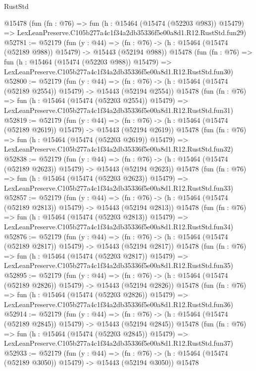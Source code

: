 \begin{lexlean}{RustStd}
\begin{coremodule}
    @15478
    (fun (fn : @76) =>
    fun (h : @15464 (@15474 (@52203 @983)) @15479) =>
    LexLeanPreserve.C105b277a4c1f34a2db35336f5e00a8d1.R12.RustStd.fun29)
@52781 := @52179
    (fun (y : @44) =>
    (fn : @76) -> (h : @15464 (@15474 (@52189 @988)) @15479) -> @15443 (@52194 @988))
    @15478
    (fun (fn : @76) =>
    fun (h : @15464 (@15474 (@52203 @988)) @15479) =>
    LexLeanPreserve.C105b277a4c1f34a2db35336f5e00a8d1.R12.RustStd.fun30)
@52800 := @52179
    (fun (y : @44) =>
    (fn : @76) -> (h : @15464 (@15474 (@52189 @2554)) @15479) -> @15443 (@52194 @2554))
    @15478
    (fun (fn : @76) =>
    fun (h : @15464 (@15474 (@52203 @2554)) @15479) =>
    LexLeanPreserve.C105b277a4c1f34a2db35336f5e00a8d1.R12.RustStd.fun31)
@52819 := @52179
    (fun (y : @44) =>
    (fn : @76) -> (h : @15464 (@15474 (@52189 @2619)) @15479) -> @15443 (@52194 @2619))
    @15478
    (fun (fn : @76) =>
    fun (h : @15464 (@15474 (@52203 @2619)) @15479) =>
    LexLeanPreserve.C105b277a4c1f34a2db35336f5e00a8d1.R12.RustStd.fun32)
@52838 := @52179
    (fun (y : @44) =>
    (fn : @76) -> (h : @15464 (@15474 (@52189 @2623)) @15479) -> @15443 (@52194 @2623))
    @15478
    (fun (fn : @76) =>
    fun (h : @15464 (@15474 (@52203 @2623)) @15479) =>
    LexLeanPreserve.C105b277a4c1f34a2db35336f5e00a8d1.R12.RustStd.fun33)
@52857 := @52179
    (fun (y : @44) =>
    (fn : @76) -> (h : @15464 (@15474 (@52189 @2813)) @15479) -> @15443 (@52194 @2813))
    @15478
    (fun (fn : @76) =>
    fun (h : @15464 (@15474 (@52203 @2813)) @15479) =>
    LexLeanPreserve.C105b277a4c1f34a2db35336f5e00a8d1.R12.RustStd.fun34)
@52876 := @52179
    (fun (y : @44) =>
    (fn : @76) -> (h : @15464 (@15474 (@52189 @2817)) @15479) -> @15443 (@52194 @2817))
    @15478
    (fun (fn : @76) =>
    fun (h : @15464 (@15474 (@52203 @2817)) @15479) =>
    LexLeanPreserve.C105b277a4c1f34a2db35336f5e00a8d1.R12.RustStd.fun35)
@52895 := @52179
    (fun (y : @44) =>
    (fn : @76) -> (h : @15464 (@15474 (@52189 @2826)) @15479) -> @15443 (@52194 @2826))
    @15478
    (fun (fn : @76) =>
    fun (h : @15464 (@15474 (@52203 @2826)) @15479) =>
    LexLeanPreserve.C105b277a4c1f34a2db35336f5e00a8d1.R12.RustStd.fun36)
@52914 := @52179
    (fun (y : @44) =>
    (fn : @76) -> (h : @15464 (@15474 (@52189 @2845)) @15479) -> @15443 (@52194 @2845))
    @15478
    (fun (fn : @76) =>
    fun (h : @15464 (@15474 (@52203 @2845)) @15479) =>
    LexLeanPreserve.C105b277a4c1f34a2db35336f5e00a8d1.R12.RustStd.fun37)
@52933 := @52179
    (fun (y : @44) =>
    (fn : @76) -> (h : @15464 (@15474 (@52189 @3050)) @15479) -> @15443 (@52194 @3050))
    @15478

\end{coremodule}
\end{lexlean}
